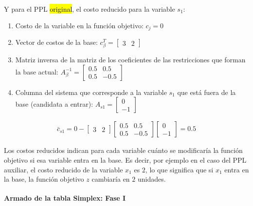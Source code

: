 \noindent Y para el PPL \hl{original}, el costo reducido para la variable \(s_1\):
\begin{enumerate}
  \item Costo de la variable en la función objetivo: \(c_j = 0\)
  \item Vector de costos de la base: \(c_\beta^T = \begin{bmatrix} 3 & 2 \end{bmatrix}\)
  \item Matriz inversa de la matriz de los coeficientes de las restricciones que forman la base actual: \(A_\beta^{-1} = \begin{bmatrix} 0.5 & 0.5\\ 0.5 & -0.5 \end{bmatrix}\)
  \item Columna del sistema que corresponde a la variable \(s_1\) que está fuera de la base (candidata a entrar): \(A_{s1} = \begin{bmatrix} 0\\ -1 \end{bmatrix}\)
\end{enumerate}
\begin{align*}
  \bar{c}_{s1} = 0 - \begin{bmatrix} 3 & 2 \end{bmatrix} \begin{bmatrix} 0.5 & 0.5\\ 0.5 & -0.5 \end{bmatrix} \begin{bmatrix} 0\\ -1 \end{bmatrix} = 0.5
\end{align*}

\vspace{5mm}

\begin{tcolorbox}[remember, title=¿Para qué usamos costos reducidos?]
  Los costos reducidos indican para cada variable cuánto se modificaría la función objetivo si esa variable entra en la base. Es decir, por ejemplo en el caso del PPL auxiliar, el costo reducido de la variable \(x_1\) es \(2\), lo que significa que si \(x_1\) entra en la base, la función objetivo \(z\) cambiaría en \(2\) unidades.
\end{tcolorbox}

\newpage

\paragraph{Armado de la tabla Simplex: Fase I}

